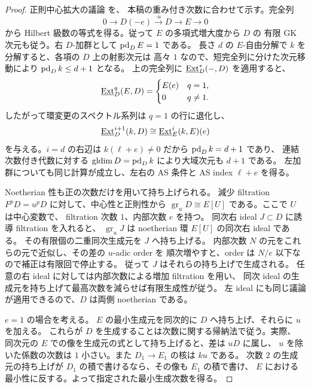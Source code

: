 \begin{proof}
正則中心拡大の議論 \cite[Propositions~2.1 and~2.3]{CKS} を、
本稿の重み付き次数に合わせて示す。完全列
\[
  0\longrightarrow D(-e)\xrightarrow{\cdot u}D
    \longrightarrow E\longrightarrow0
\]
から Hilbert 級数の等式を得る。従って $E$ の多項式増大度から $D$ の
有限 GK 次元も従う。右 $D$-加群として $\operatorname{pd}_D E=1$ である。
長さ $d$ の $E$-自由分解で $k$ を分解すると、各項の $D$ 上の射影次元は
高々 $1$ なので、短完全列に分けた次元移動により $\operatorname{pd}_D k\le d+1$ となる。
上の完全列に $\underline{\operatorname{Ext}}_D^*(-,D)$ を適用すると、
\[
  \underline{\operatorname{Ext}}_D^q(E,D)=
  \begin{cases}
    E(e)&q=1,\\
    0&q\ne1.
  \end{cases}
\]
したがって環変更のスペクトル系列は $q=1$ の行に退化し、
\begin{equation}\label{eq:central-ext-shift}
  \underline{\operatorname{Ext}}_D^{i+1}(k,D)
  \cong\underline{\operatorname{Ext}}_E^i(k,E)(e)
\end{equation}
を与える。$i=d$ の右辺は $k(\ell+e)\ne0$ だから $\operatorname{pd}_D k=d+1$ であり、
連結次数付き代数に対する $\operatorname{gldim} D=\operatorname{pd}_D k$ により大域次元も $d+1$ である。
左加群についても同じ計算が成立し、左右の AS 条件と AS index $\ell+e$ を得る。

Noetherian 性も正の次数だけを用いて持ち上げられる。
減少 filtration $F^pD=u^pD$ に対して、中心性と正則性から
$\operatorname{gr}_uD\cong E[U]$ である。ここで $U$ は中心変数で、
filtration 次数 $1$、内部次数 $e$ を持つ。
同次右 ideal $J\subset D$ に誘導 filtration を入れると、
$\operatorname{gr}_uJ$ は noetherian 環 $E[U]$ の同次右 ideal である。
その有限個の二重同次生成元を $J$ へ持ち上げる。
内部次数 $N$ の元をこれらの元で近似し、その差の $u$-adic order を
順次増やすと、order は $N/e$ 以下なので補正は有限回で停止する。
従って $J$ はそれらの持ち上げで生成される。
任意の右 ideal に対しては内部次数による増加 filtration を用い、
同次 ideal の生成元を持ち上げて最高次数を減らせば有限生成性が従う。
左 ideal にも同じ議論が適用できるので、$D$ は両側 noetherian である。

$e=1$ の場合を考える。
$E$ の最小生成元を同次的に $D$ へ持ち上げ、それらに $u$ を加える。
これらが $D$ を生成することは次数に関する帰納法で従う。実際、
同次元の $E$ での像を生成元の式として持ち上げると、差は $uD$ に属し、
$u$ を除いた係数の次数は $1$ 小さい。また $D_1\to E_1$ の核は $ku$ である。
次数 $2$ の生成元の持ち上げが $D_1$ の積で書けるなら、その像も $E_1$ の積で書け、
$E$ における最小性に反する。よって指定された最小生成次数を得る。
\end{proof}

